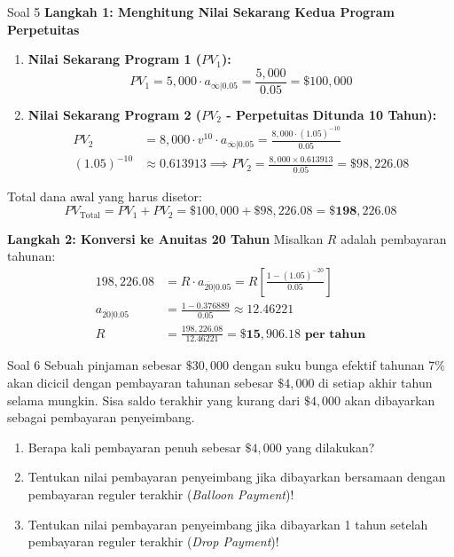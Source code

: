 \documentclass[11pt,a4paper]{article}
\begin{document}
\begin{solutionbox}{Soal 5}
\textbf{Langkah 1: Menghitung Nilai Sekarang Kedua Program Perpetuitas}
\begin{enumerate}[label=\textbf{\arabic*.}]
    \item \textbf{Nilai Sekarang Program 1 ($PV_1$):}
    \begin{equation*}
        PV_1 = 5{,}000 \cdot a_{\overline{\infty}|0.05} = \frac{5{,}000}{0.05} = \$100{,}000
    \end{equation*}

    \item \textbf{Nilai Sekarang Program 2 ($PV_2$ - Perpetuitas Ditunda 10 Tahun):}
    \begin{align*}
        PV_2 &= 8{,}000 \cdot v^{10} \cdot a_{\overline{\infty}|0.05} = \frac{8{,}000 \cdot (1.05)^{-10}}{0.05} \\[0.4em]
        (1.05)^{-10} &\approx 0.613913 \implies PV_2 = \frac{8{,}000 \times 0.613913}{0.05} = \$98{,}226.08
    \end{align*}
\end{enumerate}

Total dana awal yang harus disetor:
\begin{equation*}
    PV_{\text{Total}} = PV_1 + PV_2 = \$100{,}000 + \$98{,}226.08 = \mathbf{\$198{,}226.08}
\end{equation*}

\textbf{Langkah 2: Konversi ke Anuitas 20 Tahun}
Misalkan $R$ adalah pembayaran tahunan:
\begin{align*}
    198{,}226.08 &= R \cdot a_{\overline{20}|0.05} = R \left[\frac{1 - (1.05)^{-20}}{0.05}\right] \\[0.4em]
    a_{\overline{20}|0.05} &= \frac{1 - 0.376889}{0.05} \approx 12.46221 \\[0.4em]
    R &= \frac{198{,}226.08}{12.46221} = \mathbf{\$15{,}906.18 \text{ per tahun}}
\end{align*}
\end{solutionbox}

\vspace{1.5em}

\begin{problembox}{Soal 6}
Sebuah pinjaman sebesar $\$30{,}000$ dengan suku bunga efektif tahunan $7\%$ akan dicicil dengan pembayaran tahunan sebesar $\$4{,}000$ di setiap akhir tahun selama mungkin. Sisa saldo terakhir yang kurang dari $\$4{,}000$ akan dibayarkan sebagai pembayaran penyeimbang.
\begin{enumerate}[label=(\alph*)]
    \item Berapa kali pembayaran penuh sebesar $\$4{,}000$ yang dilakukan?
    \item Tentukan nilai pembayaran penyeimbang jika dibayarkan bersamaan dengan pembayaran reguler terakhir (\textit{Balloon Payment})!
    \item Tentukan nilai pembayaran penyeimbang jika dibayarkan 1 tahun setelah pembayaran reguler terakhir (\textit{Drop Payment})!
\end{enumerate}
\end{problembox}
\end{document}
